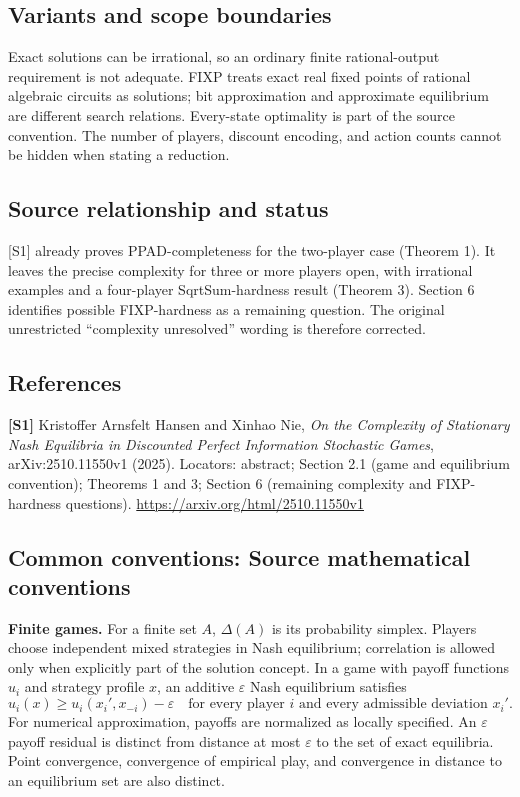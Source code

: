 \documentclass[11pt,a4paper]{article}
\begin{document}
\subsection*{Variants and scope boundaries}
Exact solutions can be irrational, so an ordinary finite rational-output requirement is not adequate. FIXP treats exact real fixed points of rational algebraic circuits as solutions; bit approximation and approximate equilibrium are different search relations. Every-state optimality is part of the source convention. The number of players, discount encoding, and action counts cannot be hidden when stating a reduction.
\subsection*{Source relationship and status}
[S1] already proves PPAD-completeness for the two-player case (Theorem 1). It leaves the precise complexity for three or more players open, with irrational examples and a four-player SqrtSum-hardness result (Theorem 3). Section 6 identifies possible FIXP-hardness as a remaining question. The original unrestricted ``complexity unresolved'' wording is therefore corrected.
\subsection*{References}
\begingroup\footnotesize\raggedright
\textbf{[S1]} Kristoffer Arnsfelt Hansen and Xinhao Nie, \emph{On the Complexity of Stationary Nash Equilibria in Discounted Perfect Information Stochastic Games}, arXiv:2510.11550v1 (2025). Locators: abstract; Section 2.1 (game and equilibrium convention); Theorems 1 and 3; Section 6 (remaining complexity and FIXP-hardness questions). \url{https://arxiv.org/html/2510.11550v1}
\par\endgroup

\subsection*{Common conventions: Source mathematical conventions}

\textbf{Finite games.} For a finite set $A$, $\Delta(A)$ is its probability
simplex. Players choose independent mixed strategies in Nash equilibrium;
correlation is allowed only when explicitly part of the solution concept.
In a game with payoff functions $u_i$ and strategy profile $x$, an additive
$\varepsilon$ Nash equilibrium satisfies
\[
 u_i(x)\geq u_i(x_i',x_{-i})-\varepsilon
 \quad\text{for every player $i$ and every admissible deviation $x_i'$}.
\]
For numerical approximation, payoffs are normalized as locally specified.
An $\varepsilon$ payoff residual is distinct from distance at most
$\varepsilon$ to the set of exact equilibria. Point convergence, convergence
of empirical play, and convergence in distance to an equilibrium set are
also distinct.
\end{document}
